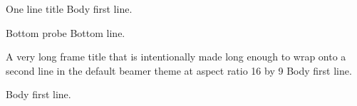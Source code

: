 \documentclass[aspectratio=169]{beamer}
\begin{document}
\begin{frame}[t]{One line title}
%
%
Body first line.
\end{frame}

\begin{frame}[b]{Bottom probe}
Bottom line.%
\end{frame}

\begin{frame}[t]{A very long frame title that is intentionally made long enough to wrap onto a second line in the default beamer theme at aspect ratio 16 by 9}
%
Body first line.
\end{frame}

\begin{frame}[t]
%
Body first line.
\end{frame}
\end{document}
